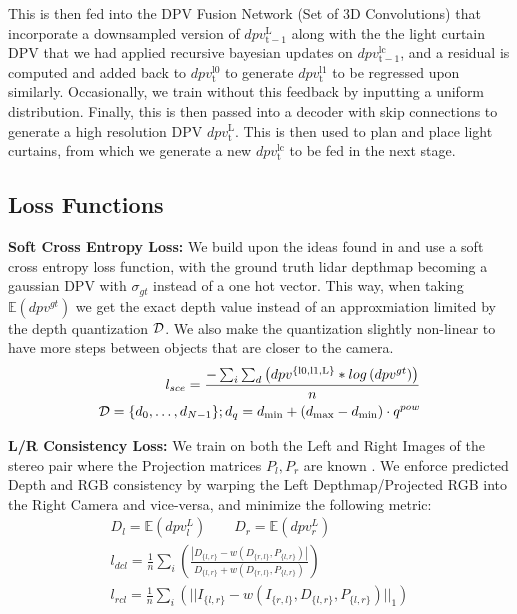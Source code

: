 This is then fed into the DPV Fusion Network (Set of 3D Convolutions) that incorporate a downsampled version of $dpv_{\mathrm{t-1}}^{\mathrm{L}}$ along with the the light curtain DPV that we had applied recursive bayesian updates on $dpv_{\mathrm{t-1}}^{\mathrm{lc}}$, and a residual is computed and added back to $dpv_{\mathrm{t}}^{\mathrm{l0}}$ to generate $dpv_{\mathrm{t}}^{\mathrm{l1}}$ to be regressed upon similarly. Occasionally, we train without this feedback by inputting a uniform distribution. Finally, this is then passed into a decoder with skip connections to generate a high resolution DPV $dpv_{\mathrm{t}}^{\mathrm{L}}$. This is then used to plan and place light curtains, from which we generate a new $dpv_{\mathrm{t}}^{\mathrm{lc}}$ to be fed in the next stage.

\subsection{Loss Functions}

\textbf{Soft Cross Entropy Loss:} We build upon the ideas found in \cite{Yang-2019-118007} and use a soft cross entropy loss function, with the ground truth lidar depthmap becoming a gaussian DPV with $\sigma_{gt}$ instead of a one hot vector. This way, when taking $\mathbb{E}\left(dpv^{gt}\right)$ we get the exact depth value instead of an approxmiation limited by the depth quantization $\mathcal{D}$. We also make the quantization slightly non-linear to have more steps between objects that are closer to the camera.
\small
\begin{align}
    l_{sce}=\frac{-\sum_{i}\sum_{d}\left(dpv^{\mathrm{\{l0,l1,L\}}}*log\left(dpv^{gt}\right)\right)}{n} \\
    \mathcal{D}=\{d_{0},\dots,d_{N-1}\};d_{q}=d_{\text{min}}+(d_{\text{max}}-d_{\text{min}})\cdot q^{pow}
   \label{eq:seloss}
\end{align}
\normalsize

\textbf{L/R Consistency Loss:} We train on both the Left and Right Images of the stereo pair where the Projection matrices $P_{l}, P_{r}$ are known \cite{godard2017unsupervised}. We enforce predicted Depth and RGB consistency by warping the Left Depthmap/Projected RGB into the Right Camera and vice-versa, and minimize the following metric:
\small
\begin{align}
    D_{l}=\mathbb{E}\left(dpv_{l}^{L}\right)\qquad D_{r}=\mathbb{E}\left(dpv_{r}^{L}\right) \\
    l_{dcl}=\frac{1}{n}\sum_{i}\left(\frac{\left|D_{\{l,r\}}-w\left(D_{\{r,l\}},P_{\{l,r\}}\right)\right|}{D_{\{l,r\}}+w\left(D_{\{r,l\}},P_{\{l,r\}}\right)}\right) \\
    l_{rcl}=\frac{1}{n}\sum_{i}\left(||I_{\{l,r\}}-w\left(I_{\{r,l\}},D_{\{l,r\}},P_{\{l,r\}}\right)||_{1}\right)
   \label{eq:lrcons} 
\end{align}
\normalsize

